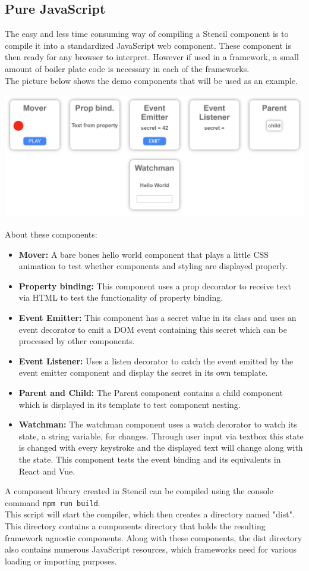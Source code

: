 \subsection{Pure JavaScript}
The easy and less time consuming way of compiling a Stencil component is to compile it into a standardized JavaScript web component. These component is then ready for any browser to interpret. However if used in a framework, a small amount of boiler plate code is necessary in each of the frameworks.\\[0.5cm]
%
The picture below shows the demo components that will be used as an example. 
\includegraphics [height=6.2cm, width=15cm] {images/demopage}
About these components:
\begin{itemize}
\item \textbf{Mover:} A bare bones hello world component that plays a little CSS animation to test whether components and styling are displayed properly.
\item \textbf{Property binding:} This component uses a prop decorator to receive text via HTML to test the functionality of property binding.
\item \textbf{Event Emitter:} This component has a secret value in its class and uses an event decorator to emit a DOM event containing this secret which can be processed by other components.
\item \textbf{Event Listener:} Uses a listen decorator to catch the event emitted by the event emitter component and display the secret in its own template.
\item \textbf{Parent and Child:} The Parent component contains a child component which is displayed in its template to test component nesting.
\item \textbf{Watchman:} The watchman component uses a watch decorator to watch its state, a string variable, for changes. Through user input via textbox this state is changed with every keystroke and the displayed text will change along with the state. This component tests the event binding and its equivalents in React and Vue.
\end{itemize}
A component library created in Stencil can be compiled using the console command \verb+npm run build+.\\
This script will start the compiler, which then creates a directory named "dist". This directory contains a components directory that holds the resulting framework agnostic components. Along with these components, the dist directory also contains numerous JavaScript resources, which frameworks need for various loading or importing purposes.

